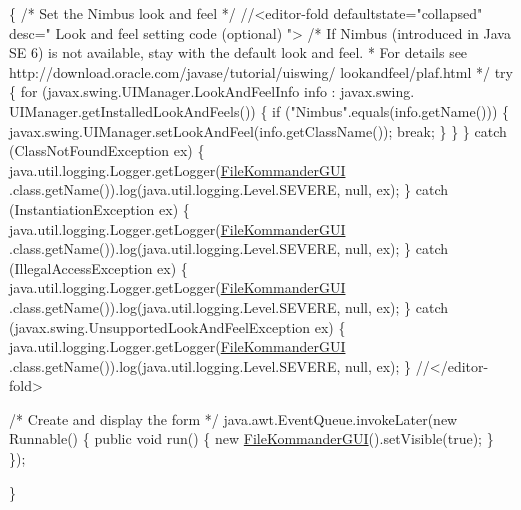 \begin{DoxyCode}
                                           \{
        \textcolor{comment}{/* Set the Nimbus look and feel */}
        \textcolor{comment}{//<editor-fold defaultstate="collapsed" desc=" Look and feel setting
       code (optional) ">}
        \textcolor{comment}{/* If Nimbus (introduced in Java SE 6) is not available, stay with the
       default look and feel.}
\textcolor{comment}{         * For details see http://download.oracle.com/javase/tutorial/uiswing/
      lookandfeel/plaf.html }
\textcolor{comment}{         */}
        \textcolor{keywordflow}{try} \{
            \textcolor{keywordflow}{for} (javax.swing.UIManager.LookAndFeelInfo info : javax.swing.
      UIManager.getInstalledLookAndFeels()) \{
                \textcolor{keywordflow}{if} (\textcolor{stringliteral}{"Nimbus"}.equals(info.getName())) \{
                    javax.swing.UIManager.setLookAndFeel(info.getClassName());
                    \textcolor{keywordflow}{break};
                \}
            \}
        \} \textcolor{keywordflow}{catch} (ClassNotFoundException ex) \{
            java.util.logging.Logger.getLogger(\hyperlink{classcom_1_1poly_1_1nlp_1_1filekommander_1_1views_1_1_file_kommander_g_u_i_a2bd0826d88caa357927705d7f14578f8}{FileKommanderGUI}
      .class.getName()).log(java.util.logging.Level.SEVERE, null, ex);
        \} \textcolor{keywordflow}{catch} (InstantiationException ex) \{
            java.util.logging.Logger.getLogger(\hyperlink{classcom_1_1poly_1_1nlp_1_1filekommander_1_1views_1_1_file_kommander_g_u_i_a2bd0826d88caa357927705d7f14578f8}{FileKommanderGUI}
      .class.getName()).log(java.util.logging.Level.SEVERE, null, ex);
        \} \textcolor{keywordflow}{catch} (IllegalAccessException ex) \{
            java.util.logging.Logger.getLogger(\hyperlink{classcom_1_1poly_1_1nlp_1_1filekommander_1_1views_1_1_file_kommander_g_u_i_a2bd0826d88caa357927705d7f14578f8}{FileKommanderGUI}
      .class.getName()).log(java.util.logging.Level.SEVERE, null, ex);
        \} \textcolor{keywordflow}{catch} (javax.swing.UnsupportedLookAndFeelException ex) \{
            java.util.logging.Logger.getLogger(\hyperlink{classcom_1_1poly_1_1nlp_1_1filekommander_1_1views_1_1_file_kommander_g_u_i_a2bd0826d88caa357927705d7f14578f8}{FileKommanderGUI}
      .class.getName()).log(java.util.logging.Level.SEVERE, null, ex);
        \}
        \textcolor{comment}{//</editor-fold>}

        \textcolor{comment}{/* Create and display the form */}
        java.awt.EventQueue.invokeLater(\textcolor{keyword}{new} Runnable() \{
            \textcolor{keyword}{public} \textcolor{keywordtype}{void} run() \{
                \textcolor{keyword}{new} \hyperlink{classcom_1_1poly_1_1nlp_1_1filekommander_1_1views_1_1_file_kommander_g_u_i_a2bd0826d88caa357927705d7f14578f8}{FileKommanderGUI}().setVisible(\textcolor{keyword}{true});
            \}
        \});
        
    \}
\end{DoxyCode}


